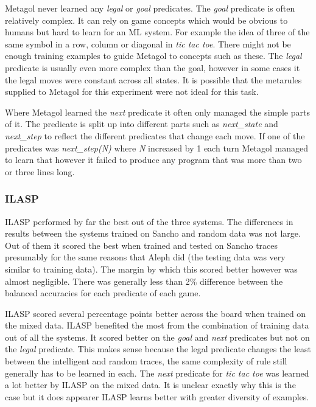 Metagol never learned any \textit{legal} or \textit{goal} predicates. The \textit{goal} predicate is often relatively complex. It can rely on game concepts which would be obvious to humans but hard to learn for an ML system. For example the idea of three of the same symbol in a row, column or diagonal in \textit{tic tac toe}. There might not be enough training examples to guide Metagol to concepts such as these. The \textit{legal} predicate is usually even more complex than the goal, however in some cases it the legal moves were constant across all states. It is possible that the metarules supplied to Metagol for this experiment were not ideal for this task.

Where Metagol learned the \textit{next} predicate it often only managed the simple parts of it. The predicate is split up into different parts such as \textit{next\_state} and \textit{next\_step} to reflect the different predicates that change each move. If one of the predicates was \textit{next\_step(N)} where \textit{N} increased by 1 each turn Metagol managed to learn that however it failed to produce any program that was more than two or three lines long.

\subsubsection{ILASP}
ILASP performed by far the best out of the three systems. The differences in results between the systems trained on Sancho and random data was not large. Out of them it scored the best when trained and tested on Sancho traces presumably for the same reasons that Aleph did (the testing data was very similar to training data). The margin by which this scored better however was almost negligible. There was generally less than 2\% difference between the balanced accuracies for each predicate of each game.

ILASP scored several percentage points better across the board when trained on the mixed data. ILASP benefited the most from the combination of training data out of all the systems. It scored better on the \textit{goal} and \textit{next} predicates but not on the \textit{legal} predicate. This makes sense because the legal predicate changes the least between the intelligent and random traces, the same complexity of rule still generally has to be learned in each. The \textit{next} predicate for \textit{tic tac toe} was learned a lot better by ILASP on the mixed data. It is unclear exactly why this is the case but it does appearer ILASP learns better with greater diversity of examples. 


